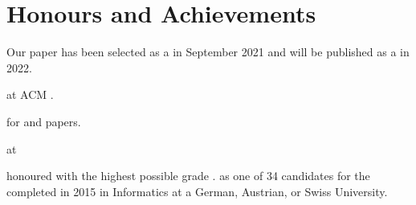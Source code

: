 \section{Honours and Achievements}
\begin{cvitemize}
    \item Our  paper has been selected as a  in September 2021 and will be published as a  in 2022.
    \item {} at ACM .
    \item {} for  and  papers.
    \item {} at
        \begin{inlineItemize}
        \item {}
        \item {}
        \end{inlineItemize}
    \item {} honoured with the highest possible grade .
           as one of 34 candidates for the  completed in 2015 in Informatics at a German, Austrian, or Swiss University.
\end{cvitemize}